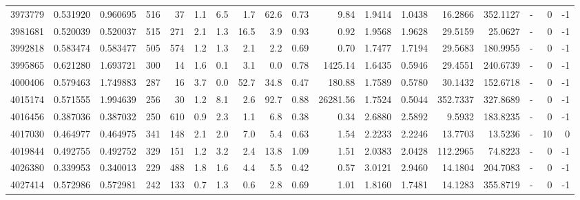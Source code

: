 \begin{tabular}{rrrrrrrrrrrrrrrlrr}
   3973779 & 0.531920 &   0.960695 &  516 &   37 &      1.1 &      6.5 &     1.7 &     62.6 &       0.73 &        9.84 &  1.9414 &  1.0438 &   16.2866 &  352.1127 &             - &        0 &         -1 \\
   3981681 & 0.520039 &   0.520037 &  515 &  271 &      2.1 &      1.3 &    16.5 &      3.9 &       0.93 &        0.92 &  1.9568 &  1.9628 &   29.5159 &   25.0627 &             - &        0 &         -1 \\
   3992818 & 0.583474 &   0.583477 &  505 &  574 &      1.2 &      1.3 &     2.1 &      2.2 &       0.69 &        0.70 &  1.7477 &  1.7194 &   29.5683 &  180.9955 &             - &        0 &         -1 \\
   3995865 & 0.621280 &   1.693721 &  300 &   14 &      1.6 &      0.1 &     3.1 &      0.0 &       0.78 &     1425.14 &  1.6435 &  0.5946 &   29.4551 &  240.6739 &             - &        0 &         -1 \\
   4000406 & 0.579463 &   1.749883 &  287 &   16 &      3.7 &      0.0 &    52.7 &     34.8 &       0.47 &      180.88 &  1.7589 &  0.5780 &   30.1432 &  152.6718 &             - &        0 &         -1 \\
   4015174 & 0.571555 &   1.994639 &  256 &   30 &      1.2 &      8.1 &     2.6 &     92.7 &       0.88 &    26281.56 &  1.7524 &  0.5044 &  352.7337 &  327.8689 &             - &        0 &         -1 \\
   4016456 & 0.387036 &   0.387032 &  250 &  610 &      0.9 &      2.3 &     1.1 &      6.8 &       0.38 &        0.34 &  2.6880 &  2.5892 &    9.5932 &  183.8235 &             - &        0 &         -1 \\
   4017030 & 0.464977 &   0.464975 &  341 &  148 &      2.1 &      2.0 &     7.0 &      5.4 &       0.63 &        1.54 &  2.2233 &  2.2246 &   13.7703 &   13.5236 &             - &       10 &          0 \\
   4019844 & 0.492755 &   0.492752 &  329 &  151 &      1.2 &      3.2 &     2.4 &     13.8 &       1.09 &        1.51 &  2.0383 &  2.0428 &  112.2965 &   74.8223 &             - &        0 &         -1 \\
   4026380 & 0.339953 &   0.340013 &  229 &  488 &      1.8 &      1.6 &     4.4 &      5.5 &       0.42 &        0.57 &  3.0121 &  2.9460 &   14.1804 &  204.7083 &             - &        0 &         -1 \\
   4027414 & 0.572986 &   0.572981 &  242 &  133 &      0.7 &      1.3 &     0.6 &      2.8 &       0.69 &        1.01 &  1.8160 &  1.7481 &   14.1283 &  355.8719 &             - &        0 &         -1 \\

\end{tabular}
